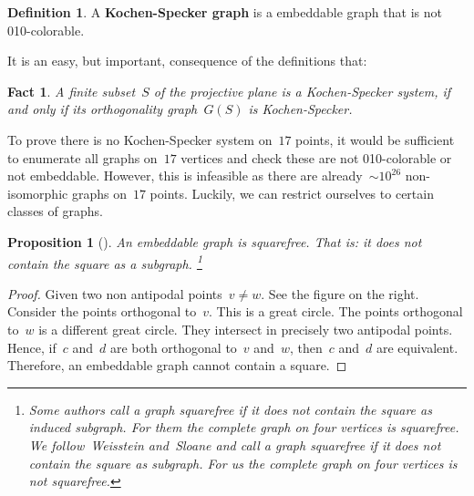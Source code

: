 \documentclass[adraft,copyright,creativecommons]{eptcs}
\newcommand{\keyword}[1]{\textbf{#1}}
\newcounter{main}
\newtheorem{prop}[main]{Proposition}
\newtheorem{fact}[main]{Fact}
\theoremstyle{definition}
\newtheorem{dfn}[main]{Definition}
\theoremstyle{remark}
\begin{document}
\begin{dfn}
A \keyword{Kochen-Specker graph}
is a embeddable graph that is not 010-colorable.
\end{dfn}
It is an easy, but important, consequence of the definitions that:
\begin{fact}
    A finite subset~$S$ of the projective plane
    is a Kochen-Specker system,
    if and only if its orthogonality graph~$G(S)$
    is Kochen-Specker.
\end{fact}

To prove there is no Kochen-Specker system on~$17$ points,
it would be sufficient to enumerate all graphs on~$17$ vertices
and check these are not 010-colorable or not embeddable.
However, this is infeasible as there are
already~${\sim}10^{26}$ non-isomorphic
graphs on~$17$ points.\cite{oeisA000088}
Luckily, we can restrict ourselves to certain classes of graphs.
\begin{prop}[\cite{aow11}]
    An embeddable graph is squarefree.
    That is: it does not contain the square as a subgraph.%
    \footnote{Some authors call a graph squarefree if it does not
        contain the square as induced subgraph.
        For them the complete graph on four vertices is squarefree.
        We follow~Weisstein\cite{sf-weisstein} and~Sloane\cite{sf-sloane} and
        call a graph squarefree if it does not
        contain the square as subgraph.
        For us the complete graph on four vertices is not squarefree.}
\end{prop}


\begin{proof}
    Given two non antipodal points~$v\neq w$.
    See the figure on the right.
    Consider the points orthogonal to~$v$.
    This is a great circle.
    The points orthogonal to~$w$ is a different great circle.
    They intersect in precisely two antipodal points.
    Hence, if~$c$ and~$d$ are both orthogonal to~$v$ and~$w$,
    then~$c$ and~$d$ are equivalent.
    Therefore, an embeddable graph cannot contain a square.
\end{proof}
\end{document}

